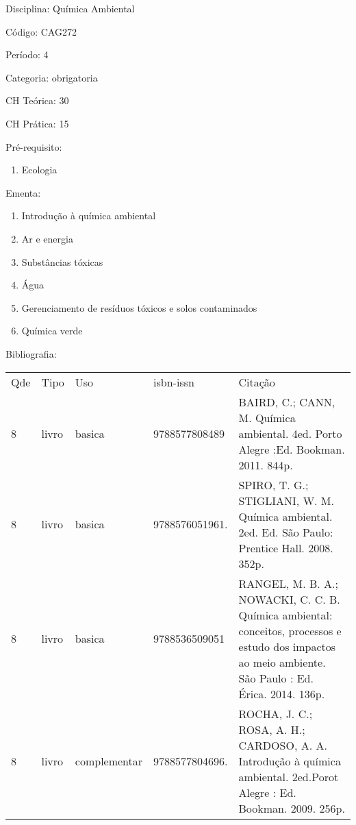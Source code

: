 \documentclass[12pt,a4paper,twoside]{report}
\begin{document}
Disciplina: Química Ambiental

Código: CAG272

Período: 4

Categoria: obrigatoria

CH Teórica: 30

CH Prática: 15




Pré-requisito:
\begin{enumerate}
\item Ecologia
\end{enumerate}

Ementa:
\begin{enumerate}
\item Introdução à química ambiental
\item Ar e energia
\item Substâncias tóxicas
\item Água
\item Gerenciamento de resíduos tóxicos e solos contaminados
\item Química verde
\end{enumerate}



Bibliografia:


\begin{tabular}{llllp{8cm}}
Qde & Tipo & Uso & isbn-issn & Citação \\
8&livro&basica&9788577808489&BAIRD, C.; CANN, M. Química ambiental. 4ed. Porto Alegre :Ed. Bookman. 2011. 844p.\\
8&livro&basica&9788576051961.&SPIRO, T. G.; STIGLIANI, W. M. Química ambiental. 2ed. Ed. São Paulo: Prentice Hall. 2008. 352p.\\
8&livro&basica&9788536509051&RANGEL, M. B. A.; NOWACKI, C. C. B. Química ambiental: conceitos, processos e estudo dos impactos ao meio ambiente. São Paulo : Ed. Érica. 2014. 136p.\\
8&livro&complementar&9788577804696.&ROCHA, J. C.; ROSA, A. H.; CARDOSO, A. A. Introdução à química ambiental. 2ed.Porot Alegre : Ed. Bookman. 2009. 256p.\\
\end{tabular}
\end{document}
